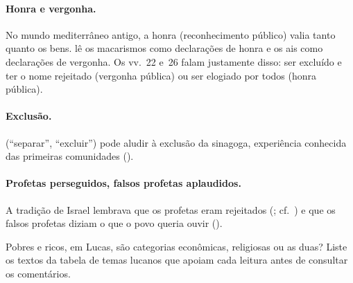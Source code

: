 \paragraph{Honra e vergonha.} No mundo mediterrâneo antigo, a honra
(reconhecimento público) valia tanto quanto os bens. \textcite{hanson1994}
lê os macarismos como declarações de honra e os ais como declarações de
vergonha. Os vv.~22 e~26 falam justamente disso: ser excluído e ter o nome
rejeitado (vergonha pública) ou ser elogiado por todos (honra pública).

\paragraph{Exclusão.}  (\enquote{separar}, \enquote{excluir})
pode aludir à exclusão da sinagoga, experiência conhecida das primeiras
comunidades ().

\paragraph{Profetas perseguidos, falsos profetas aplaudidos.} A tradição de
Israel lembrava que os profetas eram rejeitados (;
cf.\ ) e que os falsos profetas diziam o
que o povo queria ouvir ().

\begin{pergunta}\label{perg:pobres}
Pobres e ricos, em Lucas, são categorias econômicas, religiosas ou as duas?
Liste os textos da tabela de temas lucanos que apoiam cada leitura antes de
consultar os comentários.
\end{pergunta}
